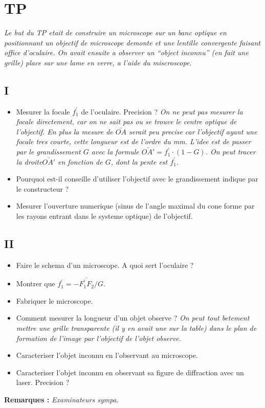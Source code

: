 \documentclass[7pt,a4paper, french]{report}
\begin{document}
\section*{TP}
\textit{Le but du TP etait de construire un microscope sur un banc optique en positionnant un objectif de microscope demonte et une lentille convergente faisant office d'oculaire. On avait ensuite a observer un ``object inconnu'' (en fait une grille) place sur une lame en verre, a l'aide du miscroscope.}
\subsection*{I}
\begin{itemize}
\item Mesurer la focale $f_1^{'}$ de l'oculaire. Precision ? \textit{On ne peut pas mesurer la focale directement, car on ne sait pas ou se trouve le centre optique de l'objectif. En plus la mesure de $\bar{OA}$ serait peu precise car l'objectif ayant une focale tres courte, cette longueur est de l'ordre du mm. L'idee est de passer par le grandissement $G$ avec la formule $\bar{OA'}=f_1^{'} \cdot (1-G)$. On peut tracer la droite$\bar{OA'}$ en fonction de $G$, dont la pente est $f_1^{'}$.}
\item Pourquoi est-il conseille d'utiliser l'objectif avec le grandissement indique par le constructeur ?
\item Mesurer l'ouverture numerique (sinus de l'angle maximal du cone forme par les rayons entrant dans le systeme optique) de l'objectif.
\end{itemize}

\subsection*{II}
\begin{itemize}
\item Faire le schema d'un microscope. A quoi sert l'oculaire ?
\item Montrer que $f_1^{'} = - \bar{F_{1}^{'}F_{2}}/G$.
\item Fabriquer le microscope.
\item Comment mesurer la longueur d'un objet observe ? \textit{On peut tout betement mettre une grille transparente (il y en avait une sur la table) dans le plan de formation de l'image par l'objectif de l'objet observe.}
\item Caracteriser l'objet inconnu en l'observant au microscope.
\item Caracteriser l'objet inconnu en observant sa figure de diffraction avec un laser. Precision ?
\end{itemize}

\textbf{Remarques :} \textit{Examinateurs sympa.}
\end{document}
